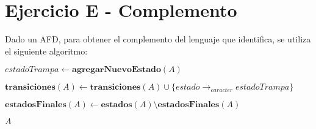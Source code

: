 \section{Ejercicio E - Complemento}

\indent \indent Dado un AFD, para obtener el complemento del lenguaje que identifica, se utiliza el siguiente algoritmo:

\begin{algorithm}
\begin{algorithmic}[1]
    \State $estadoTrampa \gets \textbf{agregarNuevoEstado}(A)$




          \State $\textbf{transiciones}(A) \gets \textbf{transiciones}(A) \cup \{estado \rightarrow_{caracter} estadoTrampa\}$
        \EndIf
      \EndFor
    \EndFor

    \State $\textbf{estadosFinales}(A) \gets \textbf{estados}(A) \setminus \textbf{estadosFinales}(A)$

    \State \Return $A$
  \EndFunction
\end{algorithmic}
\end{algorithm}
